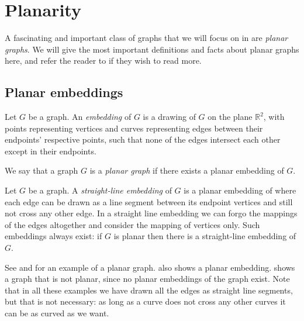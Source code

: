 \section{Planarity}
\label{section:planar-graphs}
A fascinating and important class of graphs that we will focus on in  are \emph{planar graphs}. We will give the most important definitions and facts about planar graphs here, and refer the reader to \cite{source:planar_graphs} if they wish to read more.

\subsection{Planar embeddings}
\begin{definition}[Embedding]
    Let $G$ be a graph. An \emph{embedding} of $G$ is a drawing of $G$ on the plane $\mathbb{R}^2$, with points representing vertices and curves representing edges between their endpoints' respective points, such that none of the edges intersect each other except in their endpoints.
\end{definition}

\begin{definition}
    We say that a graph $G$ is a \emph{planar graph} if there exists a planar embedding of $G$.
\end{definition}

\begin{definition}
    Let $G$ be a graph. A \emph{straight-line embedding} of $G$ is a planar embedding of where each edge can be drawn as a line segment between its endpoint vertices and still not cross any other edge. In a straight line embedding we can forgo the mappings of the edges altogether and consider the mapping of vertices only. Such embeddings always exist: if $G$ is planar then there is a straight-line embedding of $G$.
\end{definition}

See  and  for an example of a planar graph.  also shows a planar embedding.  shows a graph that is not planar, since no planar embeddings of the graph exist. Note that in all these examples we have drawn all the edges as straight line segments, but that is not necessary: as long as a curve does not cross any other curves it can be as curved as we want.

